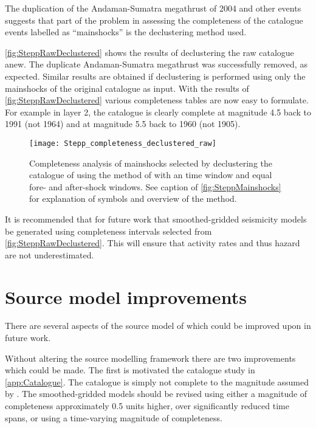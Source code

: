 \documentclass{article}
\begin{document}
\begin{appendices}
The duplication of the Andaman-Sumatra megathrust of 2004 and other events suggests that part of the problem in assessing the completeness of the catalogue events labelled as ``mainshocks'' is the declustering method used.

\autoref{fig:SteppRawDeclustered} shows the results of declustering the raw catalogue anew. 
The duplicate Andaman-Sumatra megathrust was successfully removed, as expected.
Similar results are obtained if declustering is performed using only the mainshocks of the original catalogue as input.
With the results of \autoref{fig:SteppRawDeclustered} various completeness tables are now easy to formulate.
For example in layer 2, the catalogue is clearly complete at magnitude 4.5 back to 1991 (not 1964) and at magnitude 5.5 back to 1960 (not 1905).

\begin{figure}
\begin{adjustbox}{center}
\texttt{[image: Stepp\_completeness\_declustered\_raw]}
\end{adjustbox}
\caption[Completeness analysis for a declustered catalogue]{%
Completeness analysis of mainshocks selected by declustering the catalogue of \cite{nath2010earthquake} using the method of \cite{gardner1974sequence} with an \cite{uhrhammer1986characteristics} time window and equal fore- and after-shock windows.
See caption of \autoref{fig:SteppMainshocks} for explanation of symbols and overview of the \cite{stepp1972analysis} method.
}
\label{fig:SteppRawDeclustered}
\end{figure}

It is recommended that for future work that smoothed-gridded seismicity models be generated using completeness intervals selected from \autoref{fig:SteppRawDeclustered}.
This will ensure that activity rates and thus hazard are not underestimated.

\section{Source model improvements}
\label{app:SourceModelImprovements}

There are several aspects of the source model of \cite{nath2012probabilistic} which could be improved upon in future work.

Without altering the source modelling framework there are two improvements which could be made.
The first is motivated the catalogue study in \autoref{app:Catalogue}.
The catalogue is simply not complete to the magnitude assumed by \cite{nath2012probabilistic}.
The smoothed-gridded models should be revised using either a magnitude of completeness approximately 0.5 units higher, over significantly reduced time spans, or using a time-varying magnitude of completeness.


\end{appendices}
\end{document}
